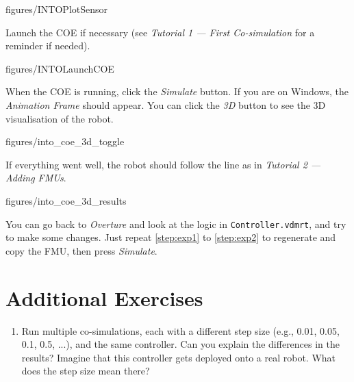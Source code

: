 \documentclass[11pt,a4paper]{../tutorial}
\begin{document}
\begin{instructions}
    \begin{annotation}[width=0.85\linewidth,trim=0 230 0 250,clip]{figures/INTOPlotSensor}
    \end{annotation}

\item Launch the COE if necessary (see \emph{Tutorial 1 --- First Co-simulation} for a reminder if needed).

    \begin{annotation}[width=0.85\linewidth,trim=0 270 0 120,clip]{figures/INTOLaunchCOE}
    \end{annotation}

\item When the COE is running, click the \emph{Simulate} button. If you are on Windows, the \emph{Animation Frame} should appear. You can click the \emph{3D} button to see the 3D visualisation of the robot.

    \begin{annotation}[width=0.55\linewidth,trim=0 0 0 0,clip]{figures/into_coe_3d_toggle}
    \end{annotation}

\item If everything went well, the robot should follow the line as in \emph{Tutorial 2 --- Adding FMUs}.

    \begin{annotation}[width=0.55\linewidth,trim=0 300 0 0,clip]{figures/into_coe_3d_results}
    \end{annotation}

    You can go back to \emph{Overture} and look at the logic in \texttt{Controller.vdmrt}, and try to make some changes. Just repeat \ref{step:exp1} to \ref{step:exp2} to regenerate and copy the FMU, then press \emph{Simulate}.

\end{instructions}

\section{Additional Exercises}

\begin{enumerate}
	\item Run multiple co-simulations, each with a different step size (e.g., 0.01, 0.05, 0.1, 0.5, ...), and the same controller. Can you explain the differences in the results? Imagine that this controller gets deployed onto a real robot. What does the step size mean there?
\end{enumerate}
\end{document}
